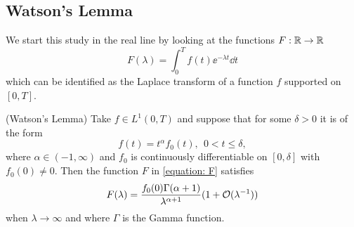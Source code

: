 \subsection{Watson's Lemma}

We start this study in the real line by looking at the functions $F: \mathbb{R} \rightarrow \mathbb{R}$
\begin{equation}
	F(\lambda) = \int_{0}^{T} f(t) \ee^{-\lambda t} \dd t
	\label{equation: F}
\end{equation}
which can be identified as the Laplace transform of a function $f$ supported on $[0,T]$.

\begin{thm}	
	(Watson's Lemma) Take $f \in L^1(0,T)$ and suppose that for some $\delta > 0$ it is of the form
	$$f(t) = t^\alpha f_0(t), \ \ 0 < t \leq \delta,$$
	where $\alpha \in (-1, \infty)$ and $f_0$ is continuously differentiable on $[0, \delta]$ with $f_0(0) \neq 0$. Then the function $F$ in \ref{equation: F} satisfies
	\begin{equation}
		F(\lambda) = \frac{f_0(0) \Gamma(\alpha + 1)}{\lambda^{\alpha + 1}} (1 + \mathcal{O}(\lambda^{-1}))
	\end{equation}
	when $\lambda \rightarrow \infty$ and where $\Gamma$ is the Gamma function.
\end{thm}

